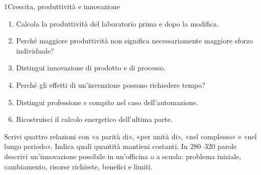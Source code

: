 \begin{lettura}{1}{Crescita, produttività e innovazione}
\attivita
\begin{enumerate}

\item Calcola la produttività del laboratorio prima e dopo la modifica.

\item Perché maggiore produttività non significa necessariamente maggiore sforzo individuale?

\item Distingui innovazione di prodotto e di processo.

\item Perché gli effetti di un’invenzione possono richiedere tempo?

\item Distingui professione e compito nel caso dell’automazione.

\item Ricostruisci il calcolo energetico dell’ultima parte.

\end{enumerate}
\lessico








\lingua
Scrivi quattro relazioni con «a parità di», «per unità di», «nel complesso» e «nel lungo periodo». Indica quali quantità mantieni costanti.
\scrittura
In 280--320 parole descrivi un’innovazione possibile in un’officina o a scuola: problema iniziale, cambiamento, risorse richieste, benefici e limiti.

\end{lettura}



